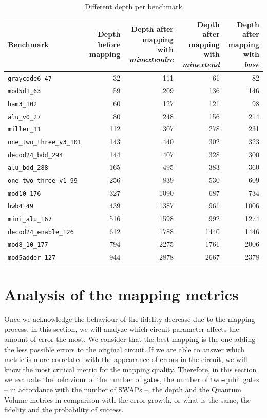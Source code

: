 \begin{table}[htbp]
\caption{\label{tab:depth_per_bench}
Different depth per benchmark}
\centering
\tiny
\begin{tabular}{lrrrr}
\hline
Benchmark & Depth before mapping & Depth after mapping with \emph{minextendrc} & Depth after mapping with \emph{minextend} & Depth after mapping with \emph{base}\\
\hline
\texttt{graycode6\_47} & 32 & 111 & 61 & 82\\
\texttt{mod5d1\_63} & 59 & 209 & 136 & 146\\
\texttt{ham3\_102} & 60 & 127 & 121 & 98\\
\texttt{alu\_v0\_27} & 80 & 248 & 156 & 214\\
\texttt{miller\_11} & 112 & 307 & 278 & 231\\
\texttt{one\_two\_three\_v3\_101} & 143 & 440 & 302 & 323\\
\texttt{decod24\_bdd\_294} & 144 & 407 & 328 & 300\\
\texttt{alu\_bdd\_288} & 165 & 495 & 383 & 360\\
\texttt{one\_two\_three\_v1\_99} & 256 & 839 & 530 & 609\\
\texttt{mod10\_176} & 327 & 1090 & 687 & 734\\
\texttt{hwb4\_49} & 439 & 1387 & 961 & 1006\\
\texttt{mini\_alu\_167} & 516 & 1598 & 992 & 1274\\
\texttt{decod24\_enable\_126} & 612 & 1788 & 1440 & 1446\\
\texttt{mod8\_10\_177} & 794 & 2275 & 1761 & 2006\\
\texttt{mod5adder\_127} & 944 & 2878 & 2667 & 2378\\
\hline
\end{tabular}
\end{table}

\section{Analysis of the mapping metrics}
\label{sec:org13f1dfb}
Once we acknowledge the behaviour of the fidelity decrease due to the mapping process, in this section, we will analyze which circuit parameter affects the amount of error the most.
We consider that the best mapping is the one adding the less possible errors to the original circuit.
If we are able to answer which metric is more correlated with the appearance of errors in the circuit, we will know the most critical metric for the mapping quality.
Therefore, in this section we evaluate the behaviour of the number of gates, the number of two-qubit gates -- in accordance with the number of SWAPs --, the depth and the Quantum Volume metrics in comparison with the error growth, or what is the same, the fidelity and the probability of success.


